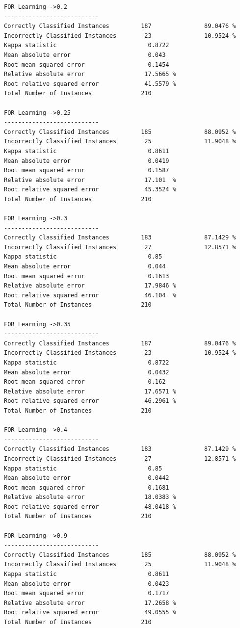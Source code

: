 \documentclass[fontsize=10pt,DIV=14]{scrartcl}
\begin{document}
\begin{itemize}
\begin{verbatim}
FOR Learning ->0.2 
---------------------------
Correctly Classified Instances         187               89.0476 %
Incorrectly Classified Instances        23               10.9524 %
Kappa statistic                          0.8722
Mean absolute error                      0.043 
Root mean squared error                  0.1454
Relative absolute error                 17.5665 %
Root relative squared error             41.5579 %
Total Number of Instances              210     

FOR Learning ->0.25 
---------------------------
Correctly Classified Instances         185               88.0952 %
Incorrectly Classified Instances        25               11.9048 %
Kappa statistic                          0.8611
Mean absolute error                      0.0419
Root mean squared error                  0.1587
Relative absolute error                 17.101  %
Root relative squared error             45.3524 %
Total Number of Instances              210     

FOR Learning ->0.3 
---------------------------
Correctly Classified Instances         183               87.1429 %
Incorrectly Classified Instances        27               12.8571 %
Kappa statistic                          0.85  
Mean absolute error                      0.044 
Root mean squared error                  0.1613
Relative absolute error                 17.9846 %
Root relative squared error             46.104  %
Total Number of Instances              210     

FOR Learning ->0.35 
---------------------------
Correctly Classified Instances         187               89.0476 %
Incorrectly Classified Instances        23               10.9524 %
Kappa statistic                          0.8722
Mean absolute error                      0.0432
Root mean squared error                  0.162 
Relative absolute error                 17.6571 %
Root relative squared error             46.2961 %
Total Number of Instances              210     

FOR Learning ->0.4 
---------------------------
Correctly Classified Instances         183               87.1429 %
Incorrectly Classified Instances        27               12.8571 %
Kappa statistic                          0.85  
Mean absolute error                      0.0442
Root mean squared error                  0.1681
Relative absolute error                 18.0383 %
Root relative squared error             48.0418 %
Total Number of Instances              210     

FOR Learning ->0.9 
---------------------------
Correctly Classified Instances         185               88.0952 %
Incorrectly Classified Instances        25               11.9048 %
Kappa statistic                          0.8611
Mean absolute error                      0.0423
Root mean squared error                  0.1717
Relative absolute error                 17.2658 %
Root relative squared error             49.0555 %
Total Number of Instances              210     


\end{verbatim}
\end{itemize}
\end{document}
